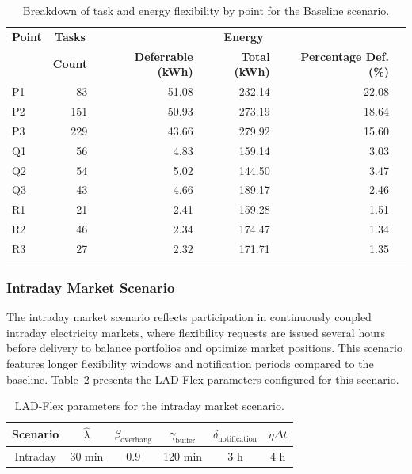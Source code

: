 \documentclass[preprint,12pt]{elsarticle}
\begin{document}
\begin{table}[h!]
\centering
\renewcommand{\arraystretch}{1.2}
\begin{tabular}{@{}lrr rrr@{}}
\toprule
\textbf{Point} & \multicolumn{1}{c}{\textbf{Tasks}} & \multicolumn{3}{c}{\textbf{Energy}} \\
              & \textbf{Count} & \textbf{Deferrable (kWh)} & \textbf{Total (kWh)} & \textbf{Percentage Def. (\%)} \\
\midrule
P1 & 83  & 51.08 & 232.14 & 22.08 \\
P2 & 151 & 50.93 & 273.19 & 18.64 \\
P3 & 229 & 43.66 & 279.92 & 15.60 \\
Q1 & 56  & 4.83  & 159.14 & 3.03  \\
Q2 & 54  & 5.02  & 144.50 & 3.47  \\
Q3 & 43  & 4.66  & 189.17 & 2.46  \\
R1 & 21  & 2.41  & 159.28 & 1.51  \\
R2 & 46  & 2.34  & 174.47 & 1.34  \\
R3 & 27  & 2.32  & 171.71 & 1.35  \\
\bottomrule
\end{tabular}
\caption{Breakdown of task and energy flexibility by point for the Baseline scenario.}
\label{tab:energy_flexibility_baseline}
\end{table}


\subsubsection{Intraday Market Scenario} \label{intraday_scenario}

The intraday market scenario reflects participation in continuously coupled intraday electricity markets, where flexibility requests are issued several hours before delivery to balance portfolios and optimize market positions. This scenario features longer flexibility windows and notification periods compared to the baseline. Table~\ref{tab:parameters_intraday} presents the LAD-Flex parameters configured for this scenario.

\begin{table}[h!]
\centering
\begin{tabular}{@{}cccccc@{}}
\toprule
\textbf{Scenario} & $\hat{\lambda}$ & $\beta_\text{overhang}$ & $\gamma_{\text{buffer}}$ & $\delta_{\text{notification}}$ & $\eta{\Delta t}$ \\ \midrule
Intraday & 30 min & 0.9 & 120 min & 3 h & 4 h \\ \bottomrule
\end{tabular}
\caption{LAD-Flex parameters for the intraday market scenario.}
\label{tab:parameters_intraday}
\end{table}
\end{document}
